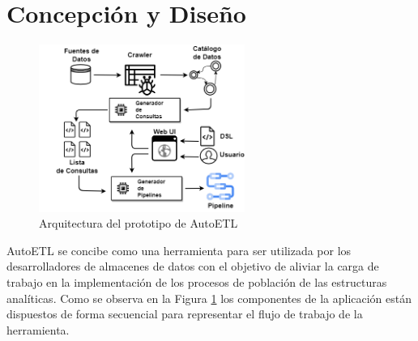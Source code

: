 \section{Concepción y Diseño}\label{section:design}

\begin{figure}
    \centering
    \includegraphics[width=0.60\textwidth]{Graphics/arch.drawio.png}
    \caption{Arquitectura del prototipo de AutoETL}
    \label{fig:arquitectura}
    \end{figure}

AutoETL se concibe como una herramienta para ser utilizada por los desarrolladores de almacenes de datos 
con el objetivo de aliviar la carga de trabajo en la implementaci\'on de los procesos de población de las 
estructuras analíticas. Como se observa en la Figura \ref{fig:arquitectura} los componentes de la aplicaci\'on 
est\'an dispuestos de forma secuencial para representar el flujo de trabajo de la herramienta.

